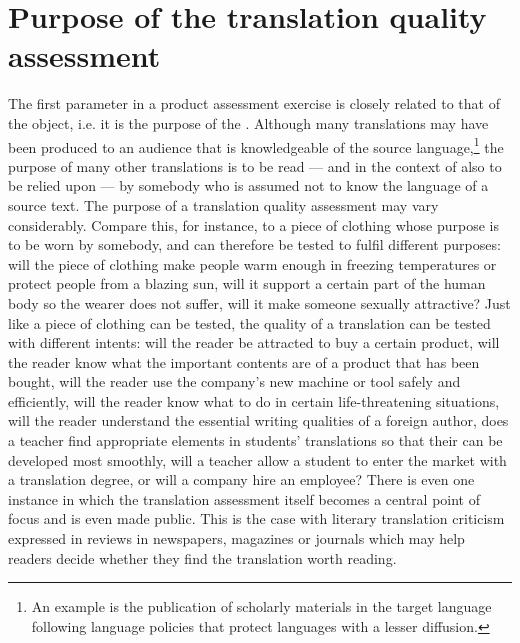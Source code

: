 \documentclass[output=paper]{langsci/langscibook}
\begin{document}
\section{Purpose of the translation quality assessment}\label{sec:vandepitte:2}

The first parameter in a product  assessment exercise is closely related to that of the object, i.e. it is the purpose of the  . Although many translations may have been produced to an audience that is knowledgeable of the source language,\footnote{An example is the publication of scholarly materials in the target language following language policies that protect languages with a lesser diffusion.} the purpose of many other translations is to be read — and in the context of  also to be relied upon — by somebody who is assumed not to know the language of a source text.
The purpose of a translation quality assessment may vary considerably. Compare this, for instance, to a piece of clothing whose purpose is to be worn by somebody, and can therefore be tested to fulfil different purposes: will the piece of clothing make people warm enough in freezing temperatures or protect people from a blazing sun, will it support a certain part of the human body so the wearer does not suffer, will it make someone sexually attractive?
Just like a piece of clothing can be tested, the quality of a translation can be tested with different intents: will the reader be attracted to buy a certain product, will the reader know what the important contents are of a product that has been bought, will the reader use the company's new machine or tool safely and efficiently, will the reader know what to do in certain life-threatening situations, will the reader understand the essential writing qualities of a foreign author, does a teacher find appropriate elements in students' translations so that their  can be developed most smoothly, will a teacher allow a student to enter the market with a translation degree, or will a company hire an employee? There is even one instance in which the translation assessment itself becomes a central point of focus and is even made public. This is the case with literary translation criticism expressed in reviews in newspapers, magazines or journals which may help readers decide whether they find the translation worth reading.
\end{document}
